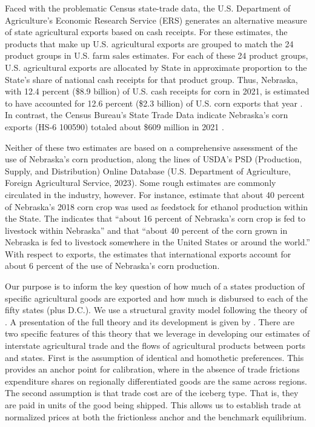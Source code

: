 \documentclass{ejb}
\begin{document}
Faced with the problematic Census state-trade data, the U.S.
Department of Agriculture's Economic Research Service (ERS) generates
an alternative measure of state agricultural exports based on cash
receipts.  For these estimates, the products that make up U.S.
agricultural exports are grouped to match the 24 product groups in
U.S. farm sales estimates. For each of these 24 
product groups, U.S. agricultural exports are allocated by State in
approximate proportion to the State's share of national cash receipts
for that product group. Thus, Nebraska, with 12.4 percent (\$8.9
billion) of U.S. cash receipts for corn in 2021, is estimated to have
accounted for 12.6 percent (\$2.3 billion) of U.S. corn exports that
year \citep{USDA_a, USDA_b}. In contrast, the Census Bureau's State Trade Data
indicate Nebraska's corn exports (HS-6 100590) totaled about \$609
million in 2021 \citep{Census}.

Neither of these two estimates are based on a comprehensive
assessment of the use of Nebraska's corn production, along the lines
of USDA's PSD (Production, Supply, and Distribution) Online Database
(U.S. Department of Agriculture, Foreign Agricultural Service, 2023).
Some rough estimates are commonly circulated in the industry,
however. For instance, \citet{Groskopf_Silva} estimate that about
40 percent of Nebraska's 2018 corn crop was used as feedstock for
ethanol production within the State. The \citet{NCBa}
indicates that ``about 16 percent of Nebraska's corn crop is fed to
livestock within Nebraska'' and that ``about 40 percent of the corn
grown in Nebraska is fed to livestock somewhere in the United States
or around the world.'' With respect to exports, the \citet{NCBb}
estimates that international exports account for about 
6 percent of the use of Nebraska's corn production.
          
Our purpose is to inform the key question of how much of a states
production of specific agricultural goods are exported and how much is
disbursed to each of the fifty states (plus D.C.).  We use a
structural gravity model following the theory of \citet{AvW}.  A
presentation of the full theory and its development is given by
\citet{Yotov_etal}.  There are two specific features of this theory
that we leverage in developing our estimates of interstate
agricultural trade and the flows of agricultural products between
ports and states. First is the assumption of identical and homothetic
preferences.  This provides an anchor point for calibration, where in
the absence of trade frictions expenditure shares on regionally
differentiated goods are the same across regions. The second
assumption is that trade cost are of the iceberg type.  That is, they
are paid in units of the good being shipped.  This allows us to
establish trade at normalized prices at both the frictionless anchor
and the benchmark equilibrium. 

\vspace{-8pt}


\end{document}
